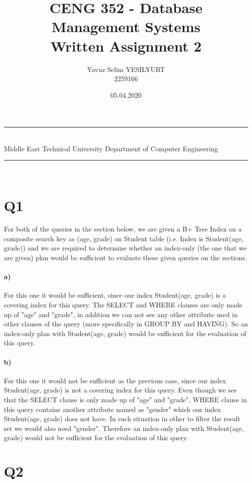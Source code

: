 \documentclass[a4paper,12pt]{article}
\title{CENG 352 - Database Management Systems \\ Written Assignment 2}
\author{Yavuz Selim YESILYURT \\ 2259166} %
\date{05.04.2020}
\newcommand{\HRule}{\rule{\linewidth}{1mm}}
\begin{document}
\HRule\\
Middle East Technical University \hfill Department of Computer Engineering
{\let\newpage\relax\maketitle}
\HRule\\
\vspace{1cm}


\section{Q1}

For both of the queries in the section below, we are given a B+ Tree Index on a composite search key as (age, grade) on Student table (i.e. Index is Student(age, grade)) and we are required to determine whether an index-only (the one that we are given) plan would be sufficient to evaluate these given queries on the sections.

\paragraph{a)} For this one it would be sufficient, since our index Student(age, grade) is a covering index for this query. The SELECT and WHERE clauses are only made up of "age" and "grade", in addition we can not see any other attribute used in other clauses of the query (more specifically in GROUP BY and HAVING). So an index-only plan with Student(age, grade) would be sufficient for the evaluation of this query. 

\paragraph{b)} For this one it would not be sufficient as the previous case, since our index Student(age, grade) is not a covering index for this query. Even though we see that the SELECT clause is only made up of "age" and "grade", WHERE clause in this query contains another attribute named as "gender" which our index Student(age, grade) does not have. In such situation in other to filter the result set we would also need "gender". Therefore an index-only plan with Student(age, grade) would not be sufficient for the evaluation of this query. 

\newpage
\section{Q2}
\end{document}
